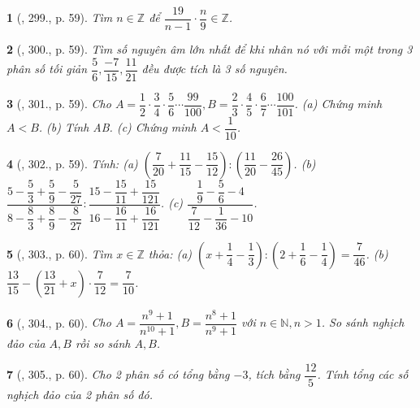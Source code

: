 \documentclass{article}
\newtheorem{baitoan}{}
\begin{document}
\begin{baitoan}[\cite{Tuyen_Toan_6}, 299., p. 59]
	Tìm $n\in\mathbb{Z}$ để $\dfrac{19}{n - 1}\cdot\dfrac{n}{9}\in\mathbb{Z}$.
\end{baitoan}

\begin{baitoan}[\cite{Tuyen_Toan_6}, 300., p. 59]
	Tìm số nguyên âm lớn nhất để khi nhân nó với mỗi một trong 3 phân số tối giản $\dfrac{5}{6},\dfrac{-7}{15},\dfrac{11}{21}$ đều được tích là 3 số nguyên.
\end{baitoan}

\begin{baitoan}[\cite{Tuyen_Toan_6}, 301., p. 59]
	Cho $A = \dfrac{1}{2}\cdot\dfrac{3}{4}\cdot\dfrac{5}{6}\cdots\dfrac{99}{100},B = \dfrac{2}{3}\cdot\dfrac{4}{5}\cdot\dfrac{6}{7}\cdots\dfrac{100}{101}$. (a) Chứng minh $A < B$. (b) Tính AB. (c) Chứng minh $A < \dfrac{1}{10}$.
\end{baitoan}

\begin{baitoan}[\cite{Tuyen_Toan_6}, 302., p. 59]
	Tính: (a) $\left(\dfrac{7}{20} + \dfrac{11}{15} - \dfrac{15}{12}\right):\left(\dfrac{11}{20} - \dfrac{26}{45}\right)$. (b) $\dfrac{5 - \dfrac{5}{3} + \dfrac{5}{9} - \dfrac{5}{27}}{8 - \dfrac{8}{3} + \dfrac{8}{9} - \dfrac{8}{27}}:\dfrac{15 - \dfrac{15}{11} + \dfrac{15}{121}}{16 - \dfrac{16}{11} + \dfrac{16}{121}}$. (c) $\dfrac{\dfrac{1}{9} - \dfrac{5}{6} - 4}{\dfrac{7}{12} - \dfrac{1}{36} - 10}$.
\end{baitoan}

\begin{baitoan}[\cite{Tuyen_Toan_6}, 303., p. 60]
	Tìm $x\in\mathbb{Z}$ thỏa: (a) $\left(x + \dfrac{1}{4} - \dfrac{1}{3}\right):\left(2 + \dfrac{1}{6} - \dfrac{1}{4}\right) = \dfrac{7}{46}$. (b) $\dfrac{13}{15} - \left(\dfrac{13}{21} + x\right)\cdot\dfrac{7}{12} = \dfrac{7}{10}$.
\end{baitoan}

\begin{baitoan}[\cite{Tuyen_Toan_6}, 304., p. 60]
	Cho $A = \dfrac{n^9 + 1}{n^{10} + 1},B = \dfrac{n^8 + 1}{n^9 + 1}$ với $n\in\mathbb{N},n > 1$. So sánh nghịch đảo của $A,B$ rồi so sánh $A,B$.
\end{baitoan}

\begin{baitoan}[\cite{Tuyen_Toan_6}, 305., p. 60]
	Cho 2 phân số có tổng bằng $-3$, tích bằng $\dfrac{12}{5}$. Tính tổng các số nghịch đảo của 2 phân số đó.
\end{baitoan}
\end{document}
